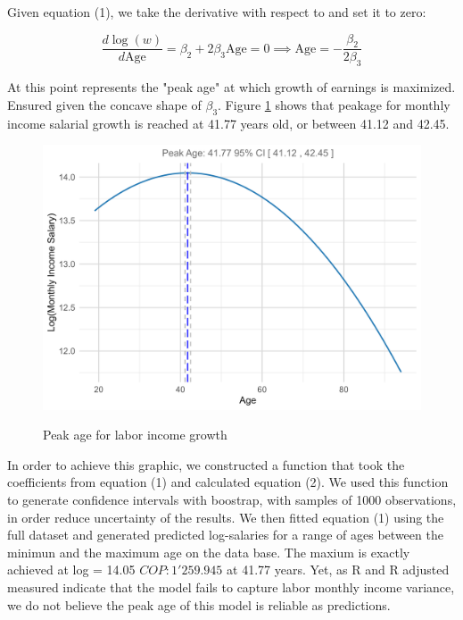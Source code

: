 \documentclass[a4paper,12pt]{article}
\begin{document}
Given equation (1), we take the derivative with respect to  and set it to zero:

\begin{equation}
\frac{d \log(w)}{d \text{Age}} = \beta_2 + 2 \beta_3 \text{Age} = 0 
\implies \text{Age} = -\frac{\beta_2}{2 \beta_3}
\end{equation}

At this point  represents the "peak age" at which growth of earnings is maximized. Ensured given the concave shape of $\beta_3$. Figure \ref{fig:PEAKAGE} shows that peakage for monthly income salarial growth is reached at 41.77 years old, or between 41.12 and 42.45. 

\begin{figure}[H]
    \centering
    \caption{Peak age for labor income growth}
    \includegraphics[width=\textwidth]{3.1PEAKAGE.png}
    \label{fig:PEAKAGE}
    \scriptsize %
\end{figure}

In order to achieve this graphic, we constructed a function that took the coefficients from equation (1) and calculated equation (2). We used this function to generate confidence intervals with boostrap, with samples of 1000 observations, in order reduce uncertainty of the results. We then fitted equation (1) using the full dataset and generated predicted log-salaries for a range of ages between the minimun and the maximum age on the data base. The maxium is exactly achieved at log = 14.05 \( COP: 1'259.945\) at 41.77 years. Yet, as R and R adjusted measured indicate that the model fails to capture labor monthly income variance, we do not believe the peak age of this model is reliable as predictions. 
\end{document}

